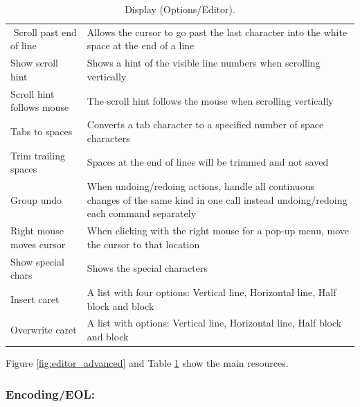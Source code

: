 \begin{table}
\begin{footnotesize}
\begin{tabularx}{\headwidth}{lX}
$$      Scroll past end of line & Allows the cursor to go past the last character into the white space at the end of a line \\
      Show scroll hint & Shows a hint of the visible line numbers when scrolling vertically \\
      Scroll hint follows mouse & The scroll hint follows the mouse when scrolling vertically \\
      Tabs to spaces & Converts a tab character to a specified number of space characters \\
      Trim trailing spaces & Spaces at the end of lines will be trimmed and not saved \\
      Group undo & When undoing/redoing actions, handle all continuous changes of the same kind in one call instead undoing/redoing
      each command separately \\
      Right mouse moves cursor & When clicking with the right mouse for a pop-up menu, move the cursor to that location \\
      Show special chars & Shows the special characters \\
      \hline %
      Insert caret & A list with four options: Vertical line, Horizontal line, Half block and block \\
      Overwrite caret & A list with options: Vertical line, Horizontal line, Half block and block \\
      \hline
    \end{tabularx}
  \end{footnotesize}
  \caption{Display (Options/Editor).}
  \label{tab:editor_advanced}
\end{table}

Figure \ref{fig:editor_advanced} and
Table \ref{tab:editor_advanced}
show the main resources.


\hypertarget{working_editor_encoding_eol}{}
\subsubsection{Encoding/EOL:}\\

